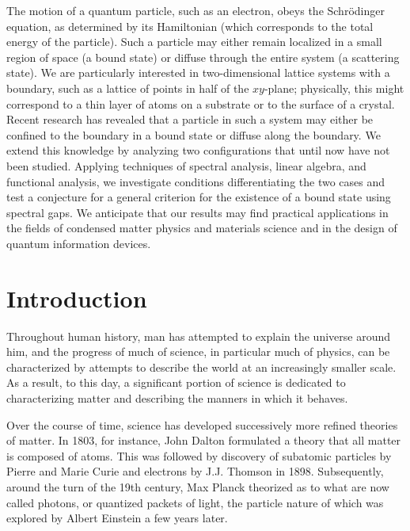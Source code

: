 \documentclass{article}
\numberwithin{equation}{section}
\numberwithin{theorem}{section}
\numberwithin{proposition}{section}
\numberwithin{lemma}{section}
\numberwithin{corollary}{section}
\numberwithin{definition}{section}
\begin{document}
The motion of a quantum particle, such as an electron, obeys the Schr\"o{}dinger equation, as determined by its Hamiltonian (which corresponds to the total energy of the particle). Such a particle may either remain localized in a small region of space (a bound state) or diffuse through the entire system (a scattering state). We are particularly interested in two-dimensional lattice systems with a boundary, such as a lattice of points in half of the $xy$-plane; physically, this might correspond to a thin layer of atoms on a substrate or to the surface of a crystal. Recent research has revealed that a particle in such a system may either be confined to the boundary in a bound state or diffuse along the boundary. We extend this knowledge by analyzing two configurations that until now have not been studied. Applying techniques of spectral analysis, linear algebra, and functional analysis, we investigate conditions differentiating the two cases and test a conjecture for a general criterion for the existence of a bound state using spectral gaps. We anticipate that our results may find practical applications in the fields of condensed matter physics and materials science and in the design of quantum information devices.

\vspace{\baselineskip}


\newpage

\section{Introduction}

Throughout human history, man has attempted to explain the universe around him, and the progress of much of science, in particular much of physics, can be characterized by attempts to describe the world at an increasingly smaller scale. As a result, to this day, a significant portion of science is dedicated to characterizing matter and describing the manners in which it behaves.

Over the course of time, science has developed successively more refined theories of matter. In 1803, for instance, John Dalton formulated a theory that all matter is composed of atoms. This was followed by discovery of subatomic particles by Pierre and Marie Curie and electrons by J.J. Thomson in 1898. Subsequently, around the turn of the 19th century, Max Planck theorized as to what are now called photons, or quantized packets of light, the particle nature of which was explored by Albert Einstein a few years later.
\end{document}
